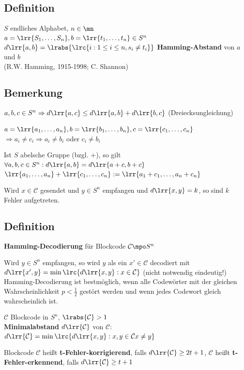 	\subsection{Definition}
		$S$ endliches Alphabet, $n\in\mn$\\
		$a=\lrr{S_1,\dots,S_n}, b=\lrr{t_1,\dots,t_n}\in S^n$\\
		$d\lrr{a,b}=\lrabs{\lrc{i:1\leq i\leq n, s_i\neq t_i}}$ \textbf{Hamming-Abstand} von $a$ und $b$\\
		(R.W. Hamming, 1915-1998; C. Shannon)
		
	\subsection{Bemerkung}
			\item $a,b,c\in S^n \Rightarrow d\lrr{a,c}\leq d\lrr{a,b}+d\lrr{b,c}$ (Dreiecksungleichung)
			
				$a=\lrr{a_1,\dots,a_n}, b=\lrr{b_1,\dots,b_n}, c=\lrr{c_1,\dots,c_n}$\\
				$\Rightarrow a_i\neq c_i\Rightarrow a_i\neq b_i$ oder $c_i\neq b_i$
			\item Ist $S$ abelsche Gruppe (bzgl. $+$), so gilt\\
				$\forall a,b,c\in S^n: d\lrr{a,b}=d\lrr{a+c,b+c}$\\
				$\lrr{a_1,\dots,a_n}+\lrr{c_1,\dots,c_n}:=\lrr{a_1+c_1,\dots, a_n+c_n}$
			\item Wird $x\in\mathcal{C}$ gesendet und $y\in S^n$ empfangen und $d\lrr{x,y}=k$, so sind $k$ Fehler aufgetreten.
		\subExEnd
		
	\subsection{Definition}
			\item \textbf{Hamming-Decodierung} für Blockcode $\mathcal{C}\mpo S^n$
			
				Wird $y\in S^n$ empfangen, so wird $y$ als ein $x'\in\mathcal{C}$ decodiert mit $d\lrr{x',y}=\min\lrc{d\lrr{x,y}:x\in\mathcal{C}}$ (nicht notwendig eindeutig!)\\
				Hamming-Decodierung ist bestmöglich, wenn alle Codewörter mit der gleichen Wahrscheinlichkeit $p<\frac{1}{2}$ gestört werden und wenn jedes Codewort gleich wahrscheinlich ist.
			\item $\mathcal{C}$ Blockcode in $S^n$, $\lrabs{\mathcal{C}}>1$\\
				\textbf{Minimalabstand} $d\lrr{\mathcal{C}}$ von $\mathcal{C}$: $d\lrr{\mathcal{C}}=\min\lrc{d\lrr{x,y}:x,y\in\mathcal{C} x\neq y}$
			\item Blockcode $\mathcal{C}$ heißt \textbf{t-Fehler-korrigierend}, falls $d\lrr{\mathcal{C}}\geq 2t+1$, $\mathcal{C}$ heißt \textbf{t-Fehler-erkennend}, falls $d\lrr{\mathcal{C}}\geq t+1$
		\subExEnd
		
